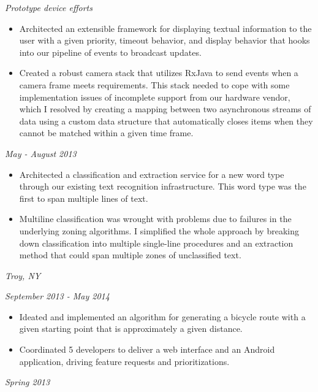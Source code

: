 \documentclass[10pt]{article}
\newenvironment{compactitemize} {
  \begin{itemize}[rightmargin=.25in, topsep=0pt]
    \setlength{\itemsep}{0pt}
    \setlength{\parsep}{0pt}
    \setlength{\parskip}{0pt}
} {
  \end{itemize}
}
\begin{document}
\noindent \emph{Prototype device efforts}
\begin{compactitemize}
\item Architected an extensible framework for displaying textual
  information to the user with a given priority, timeout behavior, and
  display behavior that hooks into our pipeline of events to broadcast
  updates.
\item Created a robust camera stack that utilizes RxJava to send
  events when a camera frame meets requirements. This stack needed to
  cope with some implementation issues of incomplete support from our
  hardware vendor, which I resolved by creating a mapping
  between two asynchronous streams of data using a custom data
  structure that automatically closes items when they cannot be
  matched within a given time frame.
\end{compactitemize}

\hfill \emph{May - August 2013}

\begin{compactitemize}
\item Architected a classification and extraction service for a new
  word type through our existing text recognition infrastructure. This
  word type was the first to span multiple lines of text.
\item Multiline classification was wrought with problems due to
  failures in the underlying zoning algorithms. I simplified the whole
  approach by breaking down classification into multiple single-line
  procedures and an extraction method that could span multiple zones
  of unclassified text.
\end{compactitemize}

 \hfill \emph{Troy, NY}

 \hfill \emph{September
  2013 - May 2014}

\begin{compactitemize}
\item Ideated and implemented an algorithm for generating a bicycle
  route with a given starting point that is approximately a given
  distance.
\item Coordinated 5 developers to deliver a web interface and an Android
  application, driving feature requests and prioritizations.
\end{compactitemize}

 \hfill \emph{Spring 2013}
\end{document}
